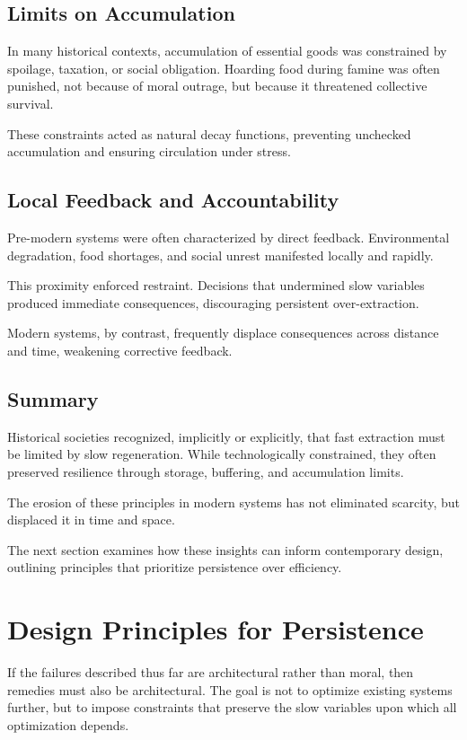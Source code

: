 \documentclass[12pt]{article} \usepackage[margin=1in]{geometry} \usepackage{setspace} \usepackage{amsmath,amssymb} \usepackage{hyperref}
\begin{document}
\subsection{Limits on Accumulation}

In many historical contexts, accumulation of essential goods was constrained by spoilage, taxation, or social obligation. Hoarding food during famine was often punished, not because of moral outrage, but because it threatened collective survival.

These constraints acted as natural decay functions, preventing unchecked accumulation and ensuring circulation under stress.

\subsection{Local Feedback and Accountability}

Pre-modern systems were often characterized by direct feedback. Environmental degradation, food shortages, and social unrest manifested locally and rapidly.

This proximity enforced restraint. Decisions that undermined slow variables produced immediate consequences, discouraging persistent over-extraction.

Modern systems, by contrast, frequently displace consequences across distance and time, weakening corrective feedback.

\subsection{Summary}

Historical societies recognized, implicitly or explicitly, that fast extraction must be limited by slow regeneration. While technologically constrained, they often preserved resilience through storage, buffering, and accumulation limits.

The erosion of these principles in modern systems has not eliminated scarcity, but displaced it in time and space.

The next section examines how these insights can inform contemporary design, outlining principles that prioritize persistence over efficiency.

\section{Design Principles for Persistence}

If the failures described thus far are architectural rather than moral, then remedies must also be architectural. The goal is not to optimize existing systems further, but to impose constraints that preserve the slow variables upon which all optimization depends.
\end{document}
